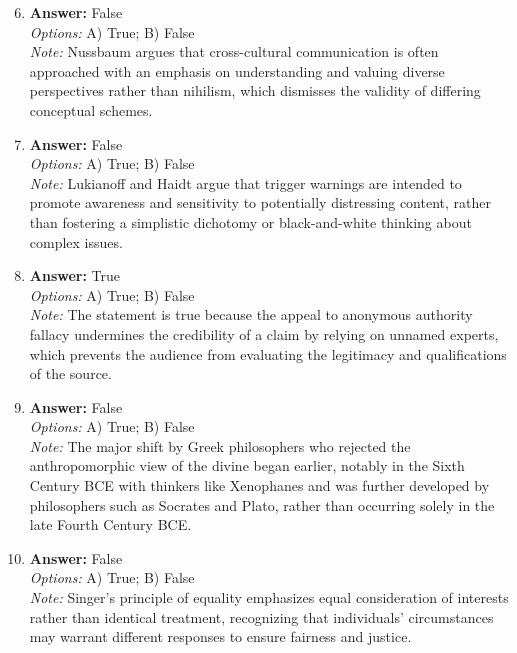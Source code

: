 \documentclass[12pt]{article}
\begin{document}
\begin{enumerate}[label=\arabic*.]
\setcounter{enumi}{5}
\item \textbf{Answer:} False
\\ \textit{Options:} A) True; B) False
\\ \textit{Note:} Nussbaum argues that cross-cultural communication is often approached with an emphasis on understanding and valuing diverse perspectives rather than nihilism, which dismisses the validity of differing conceptual schemes.
\item \textbf{Answer:} False
\\ \textit{Options:} A) True; B) False
\\ \textit{Note:} Lukianoff and Haidt argue that trigger warnings are intended to promote awareness and sensitivity to potentially distressing content, rather than fostering a simplistic dichotomy or black-and-white thinking about complex issues.
\item \textbf{Answer:} True
\\ \textit{Options:} A) True; B) False
\\ \textit{Note:} The statement is true because the appeal to anonymous authority fallacy undermines the credibility of a claim by relying on unnamed experts, which prevents the audience from evaluating the legitimacy and qualifications of the source.
\item \textbf{Answer:} False
\\ \textit{Options:} A) True; B) False
\\ \textit{Note:} The major shift by Greek philosophers who rejected the anthropomorphic view of the divine began earlier, notably in the Sixth Century BCE with thinkers like Xenophanes and was further developed by philosophers such as Socrates and Plato, rather than occurring solely in the late Fourth Century BCE.
\item \textbf{Answer:} False
\\ \textit{Options:} A) True; B) False
\\ \textit{Note:} Singer's principle of equality emphasizes equal consideration of interests rather than identical treatment, recognizing that individuals' circumstances may warrant different responses to ensure fairness and justice.
\end{enumerate}
\end{document}
